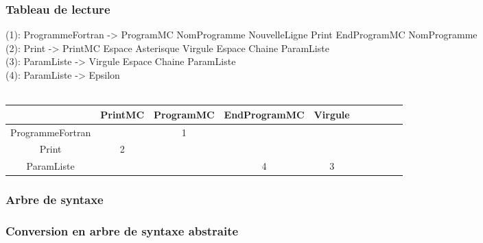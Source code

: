 \begin{frame}
    \frametitle{Tableau de lecture\esp}
    (1): ProgrammeFortran -> ProgramMC NomProgramme NouvelleLigne Print EndProgramMC NomProgramme\\
    (2): Print -> PrintMC Espace Asterisque Virgule Espace Chaine ParamListe\\
    (3): ParamListe -> Virgule Espace Chaine ParamListe\\
    (4): ParamListe ->  Epsilon \\\\
    \vspace{0.25cm}
    {
    \footnotesize
    \begin{tabular}{|c|c|c|c|c|c|c|c|c|c|}
        \hline
        & PrintMC & ProgramMC & EndProgramMC & Virgule \\
        \hline
        ProgrammeFortran & & 1 & & \\
        \hline
        Print & 2 & & & \\
        \hline
        ParamListe & & & 4 & 3 \\
        \hline
    \end{tabular}
    }

\end{frame}



\begin{frame}
    \frametitle{Arbre de syntaxe\esp}
    \begin{center}
        \scalebox{1.2}{
        
        }
        
    \end{center}
\end{frame}



\begin{frame}
    \frametitle{Conversion en arbre de syntaxe abstraite\esp}
    
\end{frame}


